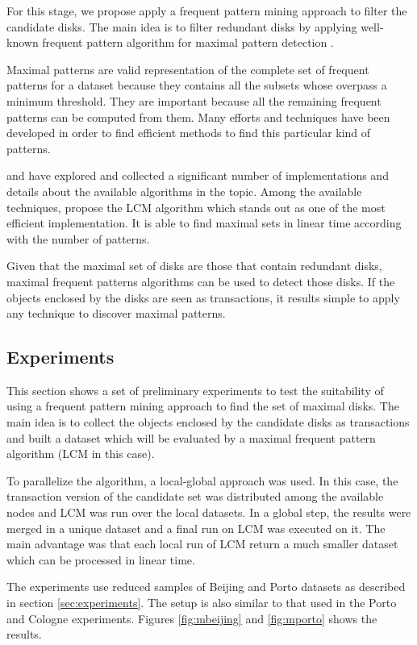 \documentclass[12pt]{scrartcl}
\begin{document}
For this stage, we propose apply a frequent pattern mining approach to filter the candidate disks.  The main idea is to filter redundant disks by applying well-known frequent pattern algorithm for maximal pattern detection \citep{Han:2005:DMC:1076797}.

Maximal patterns are valid representation of the complete set of frequent patterns for a dataset because they contains all the subsets whose overpass a minimum threshold.  They are important because all the remaining frequent patterns can be computed from them.  Many efforts and techniques have been developed in order to find efficient methods to find this particular kind of patterns.  

\cite{fimi03_report} and \cite{Fournier-Viger2016} have explored and collected a significant number of implementations and details about the available algorithms in the topic.  Among the available techniques, \cite{uno_lcm_2004} propose the LCM algorithm which stands out as one of the most efficient implementation. It is able to find maximal sets in linear time according with the number of patterns.

Given that the maximal set of disks are those that contain redundant disks, maximal frequent patterns algorithms can be used to detect those disks.  If the objects enclosed by the disks are seen as transactions, it results simple to apply any technique to discover maximal patterns.  

\subsection{Experiments}
This section shows a set of preliminary experiments to test the suitability of using a frequent pattern mining approach to find the set of maximal disks.  The main idea is to collect the objects enclosed by the candidate disks as transactions and built a dataset which will be evaluated by a maximal frequent pattern algorithm (LCM in this case).

To parallelize the algorithm, a local-global approach was used.  In this case, the transaction version of the candidate set was distributed among the available nodes and LCM was run over the local datasets.  In a global step, the results were merged in a unique dataset and a final run on LCM was executed on it.  The main advantage was that each local run of LCM return a much smaller dataset which can be processed in linear time.

The experiments use reduced samples of Beijing and Porto datasets as described in section \ref{sec:experiments}.  The setup is also similar to that used in the Porto and Cologne experiments.  Figures \ref{fig:mbeijing} and \ref{fig:mporto} shows the results.
\end{document}
